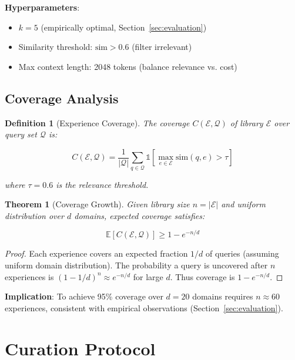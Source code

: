 \documentclass[11pt,letterpaper]{article}
\newtheorem{theorem}{Theorem}[section]
\newtheorem{definition}{Definition}[section]
\begin{document}
\textbf{Hyperparameters}:
\begin{itemize}
    \item $k = 5$ (empirically optimal, Section~\ref{sec:evaluation})
    \item Similarity threshold: $\text{sim} > 0.6$ (filter irrelevant)
    \item Max context length: 2048 tokens (balance relevance vs. cost)
\end{itemize}

\subsection{Coverage Analysis}

\begin{definition}[Experience Coverage]
The coverage $C(\mathcal{E}, \mathcal{Q})$ of library $\mathcal{E}$ over query set $\mathcal{Q}$ is:

\begin{equation}
C(\mathcal{E}, \mathcal{Q}) = \frac{1}{|\mathcal{Q}|} \sum_{q \in \mathcal{Q}} \mathbb{1}[\max_{e \in \mathcal{E}} \text{sim}(q, e) > \tau]
\end{equation}

where $\tau = 0.6$ is the relevance threshold.
\end{definition}

\begin{theorem}[Coverage Growth]
Given library size $n = |\mathcal{E}|$ and uniform distribution over $d$ domains, expected coverage satisfies:

\begin{equation}
\mathbb{E}[C(\mathcal{E}, \mathcal{Q})] \geq 1 - e^{-n/d}
\end{equation}
\end{theorem}

\begin{proof}
Each experience covers an expected fraction $1/d$ of queries (assuming uniform domain distribution). The probability a query is uncovered after $n$ experiences is $(1 - 1/d)^n \approx e^{-n/d}$ for large $d$. Thus coverage is $1 - e^{-n/d}$.
\end{proof}

\textbf{Implication}: To achieve 95\% coverage over $d=20$ domains requires $n \approx 60$ experiences, consistent with empirical observations (Section~\ref{sec:evaluation}).

\section{Curation Protocol}
\label{sec:curation}
\end{document}
